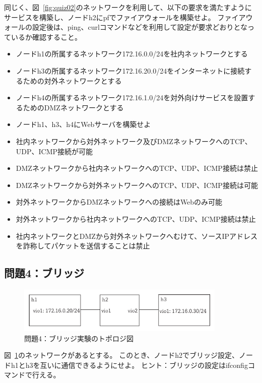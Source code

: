 同じく、図~\ref{fig:quiz02}のネットワークを利用して、以下の要求を満たすように
サービスを構築し、ノードh2にpfでファイアウォールを構築せよ。
ファイアウォールの設定後は、ping、curlコマンドなどを利用して設定が要求どおりとなっているか確認すること。

\begin{itemize}
    \item ノードh1の所属するネットワーク172.16.0.0/24を社内ネットワークとする
    \item ノードh3の所属するネットワーク172.16.20.0/24をインターネットに接続するための対外ネットワークとする
    \item ノードh4の所属するネットワーク172.16.1.0/24を対外向けサービスを設置するためのDMZネットワークとする
    \item ノードh1、h3、h4にWebサーバを構築せよ
    \item 社内ネットワークから対外ネットワーク及びDMZネットワークへのTCP、UDP、ICMP接続が可能
    \item DMZネットワークから社内ネットワークへのTCP、UDP、ICMP接続は禁止
    \item DMZネットワークから対外ネットワークへのTCP、UDP、ICMP接続は可能
    \item 対外ネットワークからDMZネットワークへの接続はWebのみ可能
    \item 対外ネットワークから社内ネットワークへのTCP、UDP、ICMP接続は禁止
    \item 社内ネットワークとDMZから対外ネットワークへむけて、ソースIPアドレスを詐称してパケットを送信することは禁止
\end{itemize}

\subsection{問題4：ブリッジ}

\begin{figure}
    \centering
    \includegraphics[width=10cm,pagebox=artbox]{figs/quiz04.pdf}
    \caption{問題4：ブリッジ実験のトポロジ図} \label{fig:quiz04}
\end{figure}

図~\ref{fig:quiz04}のネットワークがあるとする。
このとき、ノードh2でブリッジ設定、ノードh1とh3を互いに通信できるようにせよ。
ヒント：ブリッジの設定はifconfigコマンドで行える。

